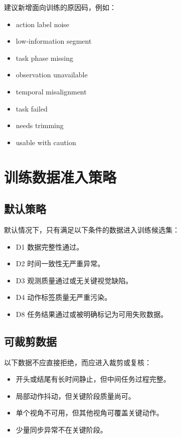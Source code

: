 \documentclass[UTF8,zihao=-4]{ctexart}
\begin{document}
建议新增面向训练的原因码，例如：

\begin{itemize}
  \item action label noise
  \item low-information segment
  \item task phase missing
  \item observation unavailable
  \item temporal misalignment
  \item task failed
  \item needs trimming
  \item usable with caution
\end{itemize}

\section{训练数据准入策略}

\subsection{默认策略}

默认情况下，只有满足以下条件的数据进入训练候选集：

\begin{itemize}
  \item D1 数据完整性通过。
  \item D2 时间一致性无严重异常。
  \item D3 观测质量通过或无关键视觉缺陷。
  \item D4 动作标签质量无严重污染。
  \item D8 任务结果通过或被明确标记为可用失败数据。
\end{itemize}

\subsection{可裁剪数据}

以下数据不应直接拒绝，而应进入裁剪或复核：

\begin{itemize}
  \item 开头或结尾有长时间静止，但中间任务过程完整。
  \item 局部动作抖动，但关键阶段质量尚可。
  \item 单个视角不可用，但其他视角可覆盖关键动作。
  \item 少量同步异常不在关键阶段。
\end{itemize}
\end{document}
